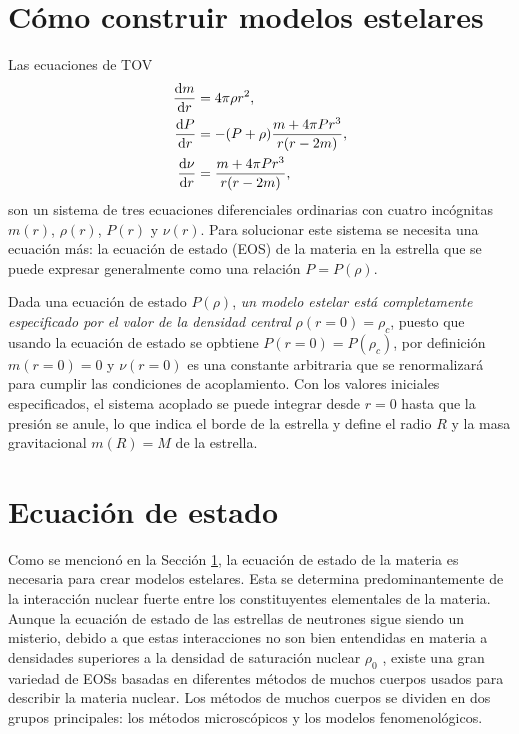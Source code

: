 \section{Cómo construir modelos estelares}\label{SMABC}

Las ecuaciones de TOV
\begin{subequations}
\begin{align}
    \dv{m}{r} &= 4\pi \rho r^2, \\
    \dv{P}{r} &= -(P+\rho)\frac{m+4\pi P r^3}{r\qty(r-2m)}, \\
    \dv{\nu}{r} &= \frac{m+4\pi P r^3}{r\qty(r-2m)},
\end{align}
\end{subequations}
son un sistema de tres ecuaciones diferenciales ordinarias con cuatro incógnitas $m(r)$, $\rho(r)$, $P(r)$ y $\nu(r)$. Para solucionar este sistema se necesita una ecuación más: la ecuación de estado (EOS) de la materia en la estrella que se puede expresar generalmente como una relación $P=P(\rho)$. 

Dada una ecuación de estado $P(\rho)$, \emph{un modelo estelar está completamente especificado por el valor de la densidad central} $\rho(r=0)=\rho_c$, puesto que usando la ecuación de estado se opbtiene $P(r=0)=P(\rho_c)$, por definición $m(r=0)=0$ y $\nu(r=0)$ es una constante arbitraria que se renormalizará para cumplir las condiciones de acoplamiento. Con los valores iniciales especificados, el sistema acoplado se puede integrar desde $r=0$ hasta que la presión se anule, lo que indica el borde de la estrella y define el radio $R$ y la masa gravitacional $m(R)=M$ de la estrella. 


\section{Ecuación de estado}\label{EOS}

Como se mencionó en la Sección \ref{SMABC}, la ecuación de estado de la materia es necesaria para crear modelos estelares. Esta se determina predominantemente de la interacción nuclear fuerte entre los constituyentes elementales de la materia. Aunque la ecuación de estado de las estrellas de neutrones sigue siendo un misterio, debido a que estas interacciones no son bien entendidas en materia a densidades superiores a la densidad de saturación nuclear $\rho_0$ \cite{Haensel2007}, existe una gran variedad de EOSs basadas en diferentes métodos de muchos cuerpos usados para describir la materia nuclear. Los métodos de muchos cuerpos se dividen en dos grupos principales: los métodos microscópicos y los modelos fenomenológicos.

